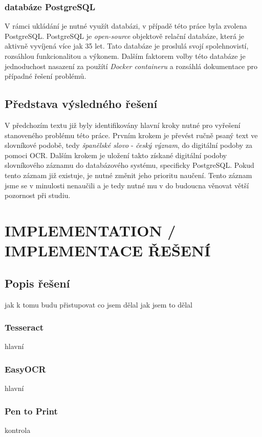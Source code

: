 \documentclass[journal]{IEEEtran}
\begin{document}
\subsubsection{databáze PostgreSQL}
V rámci ukládání je nutné využít databázi, v případě této práce byla zvolena PostgreSQL.
PostgreSQL je \textit{open-source} objektově relační databáze, která je aktivně vyvíjená více jak 35 let.
Tato databáze je proslulá svojí spolehnovistí, rozsáhlou funkcionalitou a výkonem.
Dalším faktorem volby této databáze je jednoduchost nasazení za použítí \textit{Docker containeru} a rozsáhlá dokumentace pro případné řešení problémů.\cite{postgre}

\subsection{Představa výsledného řešení}
V předchozím textu již byly identifikovány hlavní kroky nutné pro vyřešení stanoveného problému této práce.
Prvním krokem je převést ručně psaný text ve slovníkové podobě, tedy \textit{španělské slovo} - \textit{český význam}, do digitální podoby za pomoci \ac{OCR}.
Dalším krokem je uložení takto získané digitální podoby slovníkového záznamu do databázového systému, specificky PostgreSQL.\cite{postgre}
Pokud tento záznam již existuje, je nutné změnit jeho prioritu naučení.
Tento záznam jsme se v minulosti nenaučili a je tedy nutné mu v do budoucna věnovat větší pozornost při studiu.


\section{IMPLEMENTATION / IMPLEMENTACE ŘEŠENÍ}

\subsection{Popis řešení}
jak k tomu budu přistupovat
co jsem dělal
jak jsem to dělal


\subsubsection{Tesseract}
hlavní

\subsubsection{EasyOCR}
hlavní

\subsubsection{Pen to Print}
kontrola
\end{document}
